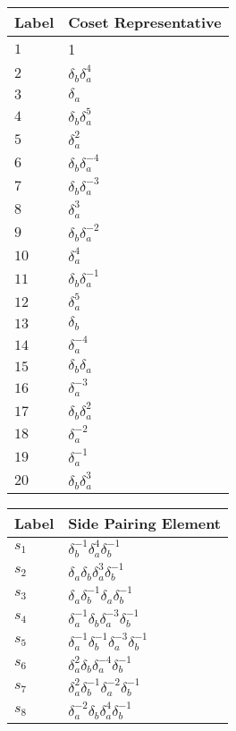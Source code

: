 \documentclass{article}
\begin{document}
\begin{center}
\begin{tabular}{ll}
\toprule
Label & Coset Representative\\
\midrule
$1$ & 1 \\
$2$ & $\delta_b^{}\delta_a^{4}$ \\
$3$ & $\delta_a^{}$ \\
$4$ & $\delta_b^{}\delta_a^{5}$ \\
$5$ & $\delta_a^{2}$ \\
$6$ & $\delta_b^{}\delta_a^{-4}$ \\
$7$ & $\delta_b^{}\delta_a^{-3}$ \\
$8$ & $\delta_a^{3}$ \\
$9$ & $\delta_b^{}\delta_a^{-2}$ \\
$10$ & $\delta_a^{4}$ \\
$11$ & $\delta_b^{}\delta_a^{-1}$ \\
$12$ & $\delta_a^{5}$ \\
$13$ & $\delta_b^{}$ \\
$14$ & $\delta_a^{-4}$ \\
$15$ & $\delta_b^{}\delta_a^{}$ \\
$16$ & $\delta_a^{-3}$ \\
$17$ & $\delta_b^{}\delta_a^{2}$ \\
$18$ & $\delta_a^{-2}$ \\
$19$ & $\delta_a^{-1}$ \\
$20$ & $\delta_b^{}\delta_a^{3}$ \\
\bottomrule
\end{tabular}
\hfill
\begin{tabular}{ll}
\toprule
Label & Side Pairing Element\\
\midrule
$s_{1}$ & $\delta_b^{-1}\delta_a^{4}\delta_b^{-1}$ \\
$s_{2}$ & $\delta_a^{}\delta_b^{}\delta_a^{3}\delta_b^{-1}$ \\
$s_{3}$ & $\delta_a^{}\delta_b^{-1}\delta_a^{}\delta_b^{-1}$ \\
$s_{4}$ & $\delta_a^{-1}\delta_b^{}\delta_a^{-3}\delta_b^{-1}$ \\
$s_{5}$ & $\delta_a^{-1}\delta_b^{-1}\delta_a^{-3}\delta_b^{-1}$ \\
$s_{6}$ & $\delta_a^{2}\delta_b^{}\delta_a^{-4}\delta_b^{-1}$ \\
$s_{7}$ & $\delta_a^{2}\delta_b^{-1}\delta_a^{-2}\delta_b^{-1}$ \\
$s_{8}$ & $\delta_a^{-2}\delta_b^{}\delta_a^{4}\delta_b^{-1}$ \\

\end{tabular}
\end{center}
\end{document}
